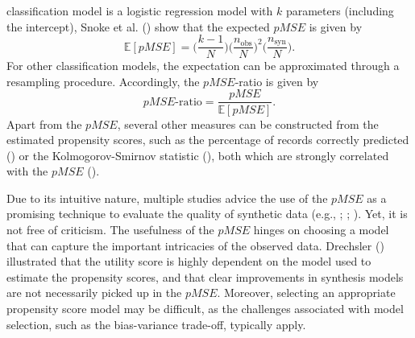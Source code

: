 \documentclass[
]{article}
\newcommand{\nobs}{n_{\text{obs}}}
\newcommand{\nsyn}{n_{\text{syn}}}
\begin{document}
classification model is a logistic regression model with \(k\)
parameters (including the intercept), Snoke et al.
() show that the expected
\(pMSE\) is given by \[
\mathbb{E}[pMSE] = \Big(\frac{k-1}{N}\Big) \Big(\frac{\nobs}{N}\Big)^2
\Big(\frac{\nsyn}{N}\Big).
\] For other classification models, the expectation can be approximated
through a resampling procedure. Accordingly, the \(pMSE\)-ratio is given
by \[
pMSE\text{-ratio} = \frac{pMSE}{\mathbb{E}[pMSE]}.
\] Apart from the \(pMSE\), several other measures can be constructed
from the estimated propensity scores, such as the percentage of records
correctly predicted () or the Kolmogorov-Smirnov statistic
(),
both which are strongly correlated with the \(pMSE\)
().

Due to its intuitive nature, multiple studies advice the use of the
\(pMSE\) as a promising technique to evaluate the quality of synthetic
data (e.g., ; ; ). Yet, it is not free of criticism. The usefulness of the \(pMSE\)
hinges on choosing a model that can capture the important intricacies of
the observed data. Drechsler
() illustrated that the
utility score is highly dependent on the model used to estimate the
propensity scores, and that clear improvements in synthesis models are
not necessarily picked up in the \(pMSE\). Moreover, selecting an
appropriate propensity score model may be difficult, as the challenges
associated with model selection, such as the bias-variance trade-off,
typically apply.
\end{document}
